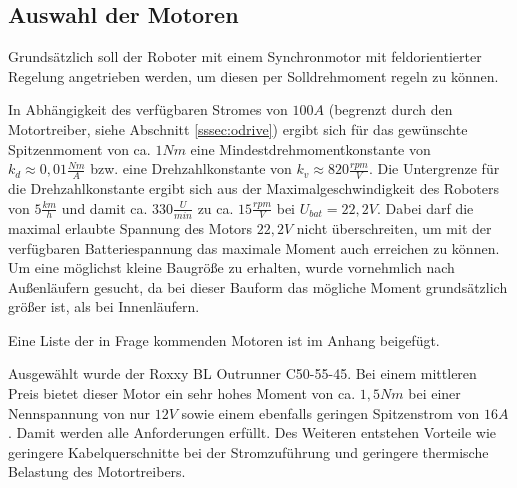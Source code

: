\renewcommand{\autoren}{Stephan Morongowski}
\newpage
\subsection{Auswahl der Motoren}

Grundsätzlich soll der Roboter mit einem Synchronmotor mit feldorientierter Regelung angetrieben werden, um diesen per Solldrehmoment regeln zu können.

In Abhängigkeit des verfügbaren Stromes von \(100 A\) (begrenzt durch den Motortreiber, siehe Abschnitt \ref{sssec:odrive}) ergibt sich für das gewünschte Spitzenmoment von ca. \(1 Nm\) eine Mindestdrehmomentkonstante von \(k_d \approx 0,01 \frac{Nm}{A}\) bzw. eine Drehzahlkonstante von \(k_v \approx  820 \frac{rpm}{V}\). Die Untergrenze für die Drehzahlkonstante ergibt sich aus der Maximalgeschwindigkeit des Roboters von \(5 \frac{km}{h}\) und damit ca. \(330 \frac{U}{min}\) zu ca. \(15 \frac{rpm}{V}\) bei \(U_{bat} = 22,2 V\). Dabei darf die maximal erlaubte Spannung des Motors \(22,2 V\) nicht überschreiten, um mit der verfügbaren Batteriespannung das maximale Moment auch erreichen zu können. Um eine möglichst kleine Baugröße zu erhalten, wurde vornehmlich nach Außenläufern gesucht, da bei dieser Bauform das mögliche Moment grundsätzlich größer ist, als bei Innenläufern.

Eine Liste der in Frage kommenden Motoren ist im Anhang beigefügt.

\label{sssec:RoxxyMotor}
Ausgewählt wurde der \glqq Roxxy BL Outrunner C50-55-45\grqq{}. Bei einem mittleren Preis bietet dieser Motor ein sehr hohes Moment von ca. \(1,5 Nm\) bei einer Nennspannung von nur \(12 V\) sowie einem ebenfalls geringen Spitzenstrom von \(16 A\). Damit werden alle Anforderungen erfüllt. Des Weiteren entstehen Vorteile wie geringere Kabelquerschnitte bei der Stromzuführung und geringere thermische Belastung des Motortreibers.
\newpage
